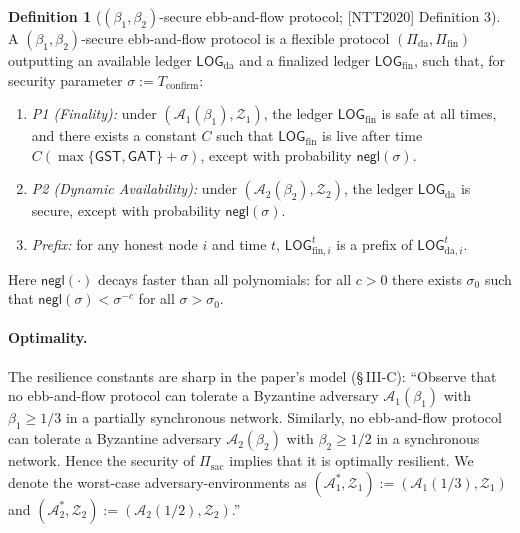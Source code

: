 \documentclass[11pt,a4paper]{article}
\theoremstyle{definition}
\newtheorem{definition}[theorem]{Definition}
\newcommand{\negl}{\mathsf{negl}}
\begin{document}
\begin{definition}[$(\beta_1, \beta_2)$-secure ebb-and-flow protocol;
{[NTT2020]} Definition 3]\label{def:xl-ebb-flow}
A $(\beta_1, \beta_2)$-secure ebb-and-flow protocol is a flexible protocol
$(\Pi_{\mathrm{da}}, \Pi_{\mathrm{fin}})$ outputting an available ledger
$\mathsf{LOG}_{\mathrm{da}}$ and a finalized ledger
$\mathsf{LOG}_{\mathrm{fin}}$, such that, for security parameter
$\sigma := T_{\mathrm{confirm}}$:
\begin{enumerate}
\item \emph{P1 (Finality):} under
  $(\mathcal{A}_1(\beta_1), \mathcal{Z}_1)$, the ledger
  $\mathsf{LOG}_{\mathrm{fin}}$ is safe at all times, and there exists a
  constant $C$ such that $\mathsf{LOG}_{\mathrm{fin}}$ is live after time
  $C(\max\{\mathsf{GST}, \mathsf{GAT}\} + \sigma)$, except with
  probability $\negl(\sigma)$.
\item \emph{P2 (Dynamic Availability):} under
  $(\mathcal{A}_2(\beta_2), \mathcal{Z}_2)$, the ledger
  $\mathsf{LOG}_{\mathrm{da}}$ is secure, except with probability
  $\negl(\sigma)$.
\item \emph{Prefix:} for any honest node $i$ and time $t$,
  $\mathsf{LOG}_{\mathrm{fin},i}^t$ is a prefix of
  $\mathsf{LOG}_{\mathrm{da},i}^t$.
\end{enumerate}
Here $\negl(\cdot)$ decays faster than all polynomials: for all $c > 0$
there exists $\sigma_0$ such that $\negl(\sigma) < \sigma^{-c}$ for all
$\sigma > \sigma_0$.
\end{definition}

\paragraph{Optimality.} The resilience constants are sharp in the paper's
model (\S\,III-C): ``Observe that no ebb-and-flow protocol can tolerate a
Byzantine adversary $\mathcal{A}_1(\beta_1)$ with $\beta_1 \ge 1/3$ in a
partially synchronous network. Similarly, no ebb-and-flow protocol can
tolerate a Byzantine adversary $\mathcal{A}_2(\beta_2)$ with
$\beta_2 \ge 1/2$ in a synchronous network. Hence the security of
$\Pi_{\mathrm{sac}}$ implies that it is optimally resilient. We denote the
worst-case adversary-environments as
$(\mathcal{A}_1^*, \mathcal{Z}_1) := (\mathcal{A}_1(1/3), \mathcal{Z}_1)$
and
$(\mathcal{A}_2^*, \mathcal{Z}_2) := (\mathcal{A}_2(1/2), \mathcal{Z}_2)$.''
\end{document}

